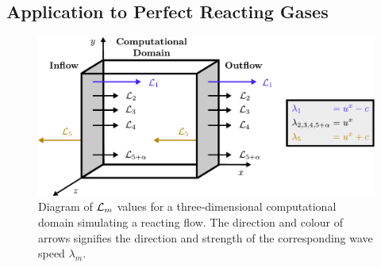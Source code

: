 \subsection{Application to Perfect Reacting Gases}

\begin{figure}[t]
\centering
\includegraphics[scale=0.60]{assets/imgs/NSCBC-L.pdf}
\caption{Diagram of $\mathcal{L}_m$ values for a three-dimensional computational domain simulating a reacting flow. The direction and colour of arrows signifies the direction and strength of the corresponding wave speed $λ_m$.}
\label{fig:NSCBC}
\end{figure}

